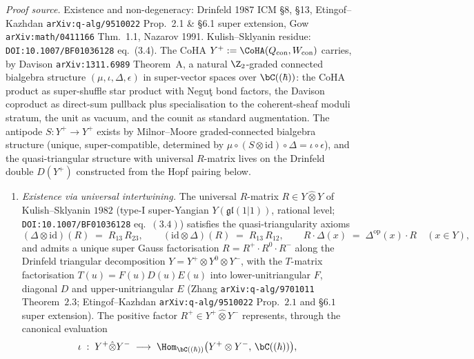 \begin{proposition}
\label{prop:conifold-hopf-pairing}
\noindent\emph{Proof source.} Existence and non-degeneracy: Drinfeld 1987 ICM \S8, \S13, Etingof--Kazhdan \texttt{arXiv:q-alg/9510022} Prop.~2.1 \& \S6.1 super extension, Gow \texttt{arXiv:math/0411166} Thm.~1.1, Nazarov 1991. Kulish--Sklyanin residue: \texttt{DOI:10.1007/BF01036128} eq.~(3.4).
The CoHA $Y^+ := \CoHA(Q_{\mathrm{con}}, W_{\mathrm{con}})$ carries, by
Davison \texttt{arXiv:1311.6989} Theorem~A, a natural $\Z_2$-graded
connected bialgebra structure $(\mu, \iota, \Delta, \epsilon)$ in
super-vector spaces over $\bC((\hbar))$: the CoHA product as
super-shuffle star product with Negu\c{t} bond factors, the Davison
coproduct as direct-sum pullback plus specialisation to the
coherent-sheaf moduli stratum, the unit as vacuum, and the counit as
standard augmentation. The antipode $S : Y^+ \to Y^+$ exists by
Milnor--Moore graded-connected bialgebra structure \textup{(}unique,
super-compatible, determined by $\mu \circ (S \otimes \mathrm{id})
\circ \Delta = \iota \circ \epsilon$\textup{),} and the quasi-triangular
structure with universal $R$-matrix lives on the Drinfeld double
$D(Y^+)$ constructed from the Hopf pairing below.
\begin{enumerate}[label=\textup{(\roman*)}]
\item \emph{Existence via universal intertwining.} The universal
 $R$-matrix $R \in Y \hat\otimes Y$ of Kulish--Sklyanin $1982$
 \textup{(}type-I super-Yangian $Y(\mathfrak{gl}(1|1))$, rational
 level; \texttt{DOI:10.1007/BF01036128} eq.~$(3.4)$\textup{)} satisfies
 the quasi-triangularity axioms
 \[
 (\Delta \otimes \mathrm{id})(R) \;=\; R_{13}\,R_{23},
 \qquad
 (\mathrm{id} \otimes \Delta)(R) \;=\; R_{13}\,R_{12},
 \qquad
 R \cdot \Delta(x) \;=\; \Delta^{\mathrm{op}}(x) \cdot R \quad(x \in Y),
 \]
 and admits a unique super Gauss factorisation
 $R = R^+ \cdot R^0 \cdot R^-$ along the Drinfeld triangular decomposition
 $Y = Y^+ \otimes Y^0 \otimes Y^-$, with the $T$-matrix factorisation
 $T(u) = F(u) D(u) E(u)$ into lower-unitriangular $F$, diagonal $D$
 and upper-unitriangular $E$ \textup{(}Zhang \texttt{arXiv:q-alg/9701011}
 Theorem~$2.3$; Etingof--Kazhdan \texttt{arXiv:q-alg/9510022} Prop.~$2.1$
 and \S$6.1$ super extension\textup{).} The positive factor
 $R^+ \in Y^+ \hat\otimes Y^-$ represents, through the canonical
 evaluation
 \[
 \iota \;:\; Y^+ \hat\otimes Y^- \;\longrightarrow\;
 \Hom_{\bC((\hbar))}\bigl(Y^+ \otimes Y^-,\, \bC((\hbar))\bigr),
\]
\end{enumerate}
\end{proposition}
